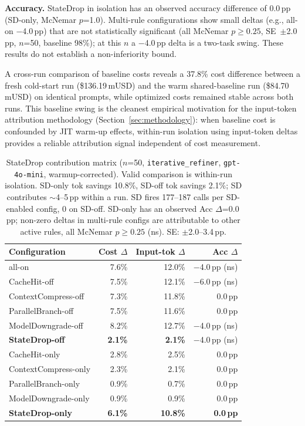 \textbf{Accuracy.} StateDrop in isolation has an observed accuracy difference of
0.0\,pp (SD-only, McNemar $p$=1.0). Multi-rule configurations show small deltas (e.g., all-on
$-$4.0\,pp) that are not statistically significant (all McNemar $p \geq 0.25$,
SE~$\pm$2.0\,pp, $n$=50, baseline 98\%); at this $n$ a $-$4.0\,pp delta is a
two-task swing. These results do not establish a non-inferiority bound.

A cross-run comparison of baseline costs reveals a 37.8\% cost difference between a
fresh cold-start run (\$136.19\,mUSD) and the warm shared-baseline run
(\$84.70\,mUSD) on identical prompts, while optimized costs remained stable across
both runs. This baseline swing is the cleanest empirical motivation for the
input-token attribution methodology (Section~\ref{sec:methodology}): when baseline
cost is confounded by JIT warm-up effects, within-run isolation using input-token
deltas provides a reliable attribution signal independent of cost measurement.

\begin{table}[t]
\caption{StateDrop contribution matrix ($n$=50, \texttt{iterative\_refiner},
\texttt{gpt-4o-mini}, warmup-corrected). Valid comparison is within-run isolation.
SD-only tok savings 10.8\%, SD-off tok savings 2.1\%; SD contributes $\sim$4--5\,pp
within a run. SD fires 177--187 calls per SD-enabled config, 0 on SD-off.
SD-only has an observed Acc $\Delta$=0.0\,pp; non-zero deltas in
multi-rule configs are attributable to other active rules, all McNemar
$p \geq 0.25$ (ns). SE: $\pm$2.0--3.4\,pp.}
\label{tab:sd-matrix}
\small
\begin{tabularx}{\columnwidth}{@{} X r r r @{}}
\toprule
Configuration & Cost $\Delta$ & \makecell[r]{Input-tok\\$\Delta$} & Acc $\Delta$ \\
\midrule
all-on                          & 7.6\%  & 12.0\%  & $-$4.0\,pp (ns) \\
CacheHit-off                    & 7.5\%  & 12.1\%  & $-$6.0\,pp (ns) \\
ContextCompress-off             & 7.3\%  & 11.8\%  & 0.0\,pp \\
ParallelBranch-off              & 7.5\%  & 11.6\%  & 0.0\,pp \\
ModelDowngrade-off              & 8.2\%  & 12.7\%  & $-$4.0\,pp (ns) \\
\textbf{StateDrop-off}          & \textbf{2.1\%}  & \textbf{2.1\%}  & $-$4.0\,pp (ns) \\
\midrule
CacheHit-only                   & 2.8\%  & 2.5\%   & 0.0\,pp \\
ContextCompress-only            & 2.3\%  & 2.1\%   & 0.0\,pp \\
ParallelBranch-only             & 0.9\%  & 0.7\%   & 0.0\,pp \\
ModelDowngrade-only             & 0.9\%  & 0.9\%   & 0.0\,pp \\
\textbf{StateDrop-only}         & \textbf{6.1\%}  & \textbf{10.8\%} & \textbf{0.0\,pp} \\
\bottomrule
\end{tabularx}
\end{table}

